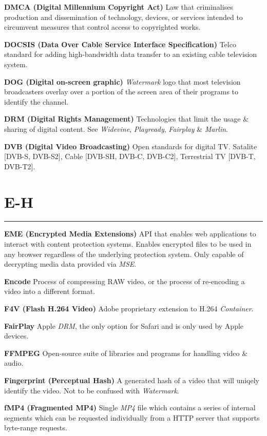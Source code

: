 \smallskip
\textbf{DMCA (Digital Millennium Copyright Act)}
Law that criminalises production and dissemination of technology, devices, or services intended to circumvent measures that control access to copyrighted works.

\smallskip
\textbf{DOCSIS (Data Over Cable Service Interface Specification)}
Telco standard for adding high-bandwidth data transfer to an existing cable television system.

\smallskip
\textbf{DOG (Digital on-screen graphic)}
\textit{Watermark} logo that most television broadcasters overlay over a portion of the screen area of their programs to identify the channel.

\smallskip
\textbf{DRM (Digital Rights Management)}
Technologies that limit the usage \& sharing of digital content.  See \textit{Widevine}, \textit{Playready}, \textit{Fairplay} \& \textit{Marlin}.

\smallskip
\textbf{DVB (Digital Video Broadcasting)}
Open standards for digital TV.  Satalite [DVB-S, DVB-S2], Cable [DVB-SH, DVB-C, DVB-C2], Terrestrial TV [DVB-T, DVB-T2].


\section{E-H}
\hrule

\medskip
\textbf{EME (Encrypted Media Extensions)}
API that enables web applications to interact with content protection systems. Enables encrypted files to be used in any browser regardless of the underlying protection system. Only capable of decrypting media data provided via \textit{MSE}.

\smallskip
\textbf{Encode}
Process of compressing RAW video, or the process of re-encoding a video into a different format.

\smallskip
\textbf{F4V (Flash H.264 Video)}
Adobe proprietary extension to H.264 \textit{Container}.

\smallskip
\textbf{FairPlay}
Apple \textit{DRM}, the only option for Safari and is only used by Apple devices.

\smallskip
\textbf{FFMPEG}
Open-source suite of libraries and programs for handling video \& audio.

\smallskip
\textbf{Fingerprint (Perceptual Hash)}
A generated hash of a video that will uniqely identify the video. Not to be confused with \textit{Watermark}.

\smallskip
\textbf{fMP4 (Fragmented MP4)}
Single \textit{MP4} file which contains a series of internal segments which can be requested individually from a HTTP server that supports byte-range requests.

